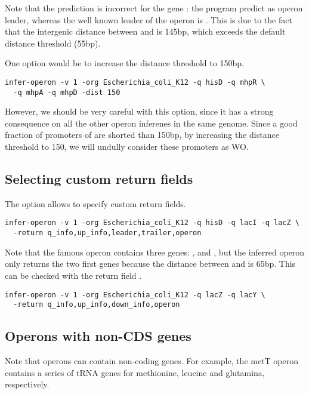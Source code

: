 Note that the prediction is incorrect for the gene : the
program predict  as operon leader, whereas the well known
leader of the  operon is . This is due to the
fact that the intergenic distance between  and 
is 145bp, which exceeds the default distance threshold (55bp). 

One option would be to increase the distance threshold to 150bp. 


\begin{lstlisting}
infer-operon -v 1 -org Escherichia_coli_K12 -q hisD -q mhpR \
  -q mhpA -q mhpD -dist 150
\end{lstlisting}

However, we should be very careful with this option, since it has a
strong consequence on all the other operon inferenes in the same
genome. Since a good fraction of promoters of 
are shorted than 150bp, by increasing the distance threshold to 150,
we will undully consider these promoters as WO.

\subsection{Selecting custom return fields}

The option  allows to specify custom return fields.

\begin{lstlisting}
infer-operon -v 1 -org Escherichia_coli_K12 -q hisD -q lacI -q lacZ \
  -return q_info,up_info,leader,trailer,operon
\end{lstlisting}

Note that the famous  operon contains three genes:
,  and , but the inferred operon only
returns the two first genes because the distance between 
and \gene{lacA} is 65bp. This can be checked with the return field
\option{down\_info}.

\begin{lstlisting}
infer-operon -v 1 -org Escherichia_coli_K12 -q lacZ -q lacY \
  -return q_info,up_info,down_info,operon
\end{lstlisting}

\subsection{Operons with non-CDS genes}

Note that operons can contain non-coding genes. For example, the
metT operon contains a series of tRNA genes for methionine, leucine
and glutamina, respectively.

